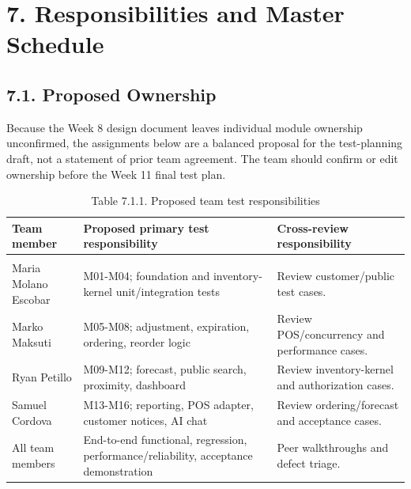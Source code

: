 \clearpage
\section{7. Responsibilities and Master Schedule}\label{responsibilities-and-master-schedule}

\subsection{7.1. Proposed Ownership}\label{proposed-ownership}

Because the Week 8 design document leaves individual module ownership unconfirmed, the assignments below are a balanced proposal for the test-planning draft, not a statement of prior team agreement. The team should confirm or edit ownership before the Week 11 final test plan.

{\def\LTcaptype{none} %
\begin{longtable}[]{|
  >{\raggedright\arraybackslash}m{}|
  >{\raggedright\arraybackslash}m{}|
  >{\raggedright\arraybackslash}m{}|}
\hline
\begin{minipage}[c]{\linewidth}\raggedright
\textbf{Team member}
\end{minipage} & \begin{minipage}[c]{\linewidth}\raggedright
\textbf{Proposed primary test responsibility}
\end{minipage} & \begin{minipage}[c]{\linewidth}\raggedright
\textbf{Cross-review responsibility}
\end{minipage} \\
\hline
\endhead

\caption*{Table 7.1.1. Proposed team test responsibilities}\\
\endlastfoot
Maria Molano Escobar & M01-M04; foundation and inventory-kernel unit/integration tests & Review customer/public test cases. \\ \hline
Marko Maksuti & M05-M08; adjustment, expiration, ordering, reorder logic & Review POS/concurrency and performance cases. \\ \hline
Ryan Petillo & M09-M12; forecast, public search, proximity, dashboard & Review inventory-kernel and authorization cases. \\ \hline
Samuel Cordova & M13-M16; reporting, POS adapter, customer notices, AI chat & Review ordering/forecast and acceptance cases. \\ \hline
All team members & End-to-end functional, regression, performance/reliability, acceptance demonstration & Peer walkthroughs and defect triage. \\ \hline
\end{longtable}
}

